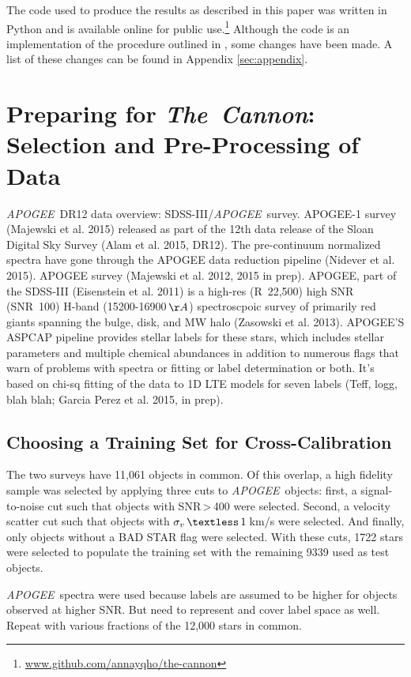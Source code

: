 \documentclass[12pt, preprint]{aastex}
\newcommand{\tc}{\textsl{The~Cannon}}
\newcommand{\apogee}{\textsl{APOGEE}}
\begin{document}
The code used to produce the results as described in this paper was written in
Python and is available online for public 
use.\footnote{\url{www.github.com/annayqho/the-cannon}}
Although the code is an implementation of the procedure outlined in 
\citep{ness2015}, some changes have been made. A list of these changes 
can be found in Appendix \ref{sec:appendix}.

\section{Preparing for \tc: Selection and Pre-Processing of Data}

\apogee\ DR12 data overview: SDSS-III/\apogee\ survey. APOGEE-1 survey 
(Majewski et al. 2015) released as part of the 12th data release of the Sloan
Digital Sky Survey (Alam et al. 2015, DR12). The pre-continuum normalized
spectra have gone through the APOGEE data reduction pipeline 
(Nidever et al. 2015). APOGEE survey (Majewski et al. 2012, 2015 in prep). 
APOGEE, part of the SDSS-III (Eisenstein et al. 2011) is a high-res
(R~22,500) high SNR (SNR~100) H-band (15200-16900\,$\AA$) spectroscpoic
survey of primarily red giants spanning the bulge, disk, and MW halo 
(Zasowski et al. 2013). APOGEE'S ASPCAP pipeline provides stellar labels for
these stars, which includes stellar parameters and multiple chemical 
abundances in addition to numerous flags that warn of problems with spectra
or fitting or label determination or both. It's based on chi-sq fitting of
the data to 1D LTE models for seven labels (Teff, logg, blah blah; Garcia 
Perez et al. 2015, in prep). 
\subsection{Choosing a Training Set for Cross-Calibration}

The two surveys have 11,061 objects in common. Of this overlap, a high 
fidelity sample was selected by applying three cuts to \apogee\ objects: 
first, a signal-to-noise cut such that objects with SNR\,\textgreater\,400 
were selected. Second, a velocity scatter cut such that objects with 
$\sigma_v\,\textless\,1$\,km/s were selected. And finally, only objects
without a BAD STAR flag were selected. With these cuts, 1722 stars were
selected to populate the training set with the remaining 9339 used as test
objects. 

\apogee\ spectra
were used because labels are assumed to be higher for objects observed at
higher SNR.  
But need to represent and cover label space as well. Repeat with 
various fractions of the 12,000 stars in common.
\end{document}
